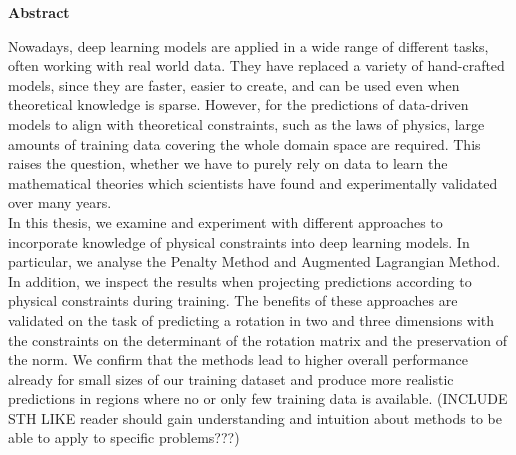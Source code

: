 


\vspace*{2cm}
\begin{center}
{\Large \textbf{Abstract}}
\end{center}
\vspace{1cm}


Nowadays, deep learning models are applied in a wide range of different tasks, often working with real world data. They have replaced a variety of hand-crafted models, since they are faster, easier to create, and can be used even when theoretical knowledge is sparse. However, for the predictions of data-driven models to align with theoretical constraints, such as the laws of physics, large amounts of training data covering the whole domain space are required. This raises the question, whether we have to purely rely on data to learn the mathematical theories which scientists have found and experimentally validated over many years. \\
\indent In this thesis, we examine and experiment with different approaches to incorporate knowledge of physical constraints into deep learning models. In particular, we analyse the Penalty Method and Augmented Lagrangian Method. In addition, we inspect the results when projecting predictions according to physical constraints during training. The benefits of these approaches are validated on the task of predicting a rotation in two and three dimensions with the constraints on the determinant of the rotation matrix and the preservation of the norm. We confirm that the methods lead to higher overall performance already for small sizes of our training dataset and produce more realistic predictions in regions where no or only few training data is available. (INCLUDE STH LIKE reader should gain understanding and intuition about methods to be able to apply to specific problems???)

